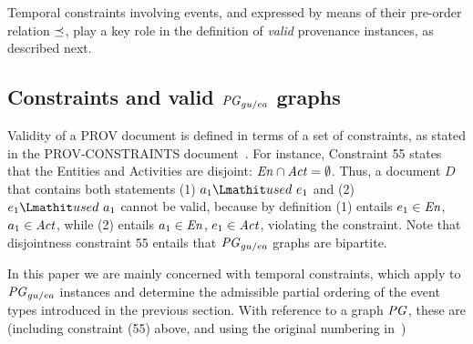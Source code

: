 Temporal constraints involving events, and expressed by means of their pre-order relation $\preceq$, play a key role in the definition of \textit{valid} provenance instances, as described next.

\subsection{Constraints and valid $\mathit{PG}_{gu/ea}$ graphs}
\label{sec:prov-constraints}

Validity of a PROV document is defined in terms of a set of constraints, as stated in the PROV-CONSTRAINTS document~\citep{w3c-prov-constraints}.
%
For instance, Constraint 55 states that the Entities and Activities are disjoint:  $\mathit{En} \cap \mathit{Act} = \emptyset$.
Thus, a document $D$ that contains both statements (1) $a_1 \used~e_1$ and (2) $e_1 \used ~a_1$ cannot be valid, because by definition%
 (1) entails  $e_1 \in \mathit{En}$, $a_1 \in \mathit{Act}$, while (2) entails $a_1 \in \mathit{En}$, $e_1 \in \mathit{Act}$, violating the constraint.
%
Note that disjointness constraint 55 entails that $\mathit{PG}_{gu/ea}$ graphs are bipartite.

In this paper we are mainly concerned with temporal constraints, which apply to $\mathit{PG}_{gu/ea}$ instances and determine the admissible partial ordering of the event types introduced in the previous section.
With reference to a graph $\mathit{PG}$, these are (including constraint (55) above, and using the original numbering in~\citep{w3c-prov-constraints})

